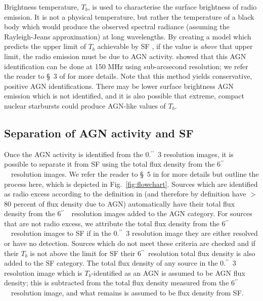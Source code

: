 \documentclass[usenatbib,fleqn,letters]{mnras}
\newcommand{\sarc}{$^{\prime\prime}\!\!$}
\begin{document}
Brightness temperature, $T_b$, is used to characterise the surface brightness of radio emission. It is not a physical temperature, but rather the temperature of a black body  which would produce the observed spectral radiance (assuming the Rayleigh-Jeans approximation) at long wavelengths. By creating a model which predicts the upper limit of $T_b$ achievable by SF \citep[based on][]{condon_radio_1992}, if the value is \textit{above} that upper limit, the radio emission must be due to AGN activity.   showed that this AGN identification can be done at 150 MHz using sub-arcsecond resolution; 
we refer the reader to \S~3 of  for more details. Note that this method yields conservative, positive AGN identifications. There may be lower surface brightness AGN emission which is not identified, and it is also possible \citep[although unlikely, according to][]{condon_radio_1992} that extreme, compact nuclear starbursts could produce AGN-like values of $T_b$. 

\subsection{Separation of AGN activity and SF}
Once the AGN activity is identified from the 0.\sarc\ 3 resolution images, it is possible to separate it from SF using the total flux density from the 6\sarc\ \ resolution images. We refer the reader to \S~5 in  for more details but outline the process here, which is depicted in Fig.~\ref{fig:flowchart}. Sources which are identified as radio excess according to the definition in  (and therefore by definition have $>$80 percent of flux density due to AGN) automatically have their total flux density from the 6\sarc\ \ resolution images added to the AGN category. For sources that are not radio excess, we attribute the total flux density from the 6\sarc\ \ resolution images to SF if in the 0.\sarc\ 3 resolution image they are either resolved or have no detection. Sources which do not meet these criteria are checked and if their $T_b$ is not above the limit for SF their 6\sarc\ resolution total flux density is also added to the SF category. The total flux density of any source in the 0.\sarc\ 3 resolution image which is $T_b$-identified as an AGN is assumed to be AGN flux density; this is subtracted from the total flux density measured from the 6\sarc\ \ resolution image, and what remains is assumed to be flux density from SF. %
\end{document}
